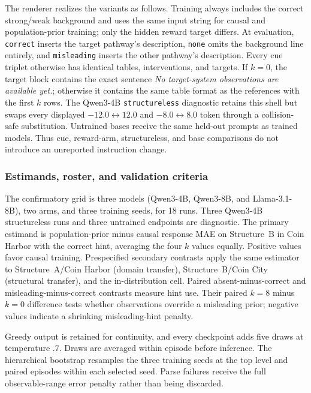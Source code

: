 The renderer realizes the variants as follows. Training always includes the
correct strong/weak background and uses the same input string for causal and
population-prior training; only the hidden reward target differs. At evaluation,
\texttt{correct} inserts the target pathway's description, \texttt{none} omits
the background line entirely, and \texttt{misleading} inserts the other
pathway's description. Every cue triplet otherwise has identical tables,
interventions, and targets. If $k=0$, the target block contains the exact
sentence \emph{No target-system observations are available yet.}; otherwise it
contains the same table format as the references with the first $k$ rows. The
Qwen3-4B \texttt{structureless} diagnostic retains this shell but swaps every
displayed $-12.0\leftrightarrow12.0$ and $-8.0\leftrightarrow8.0$ token through
a collision-safe substitution. Untrained bases receive the same held-out
prompts as trained models. Thus cue, reward-arm, structureless, and base
comparisons do not introduce an unreported instruction change.

\subsubsection{Estimands, roster, and validation criteria}

The confirmatory grid is three models (Qwen3-4B, Qwen3-8B, and
Llama-3.1-8B), two arms, and three training seeds, for 18 runs. Three
Qwen3-4B structureless runs and three untrained endpoints are diagnostic.
The primary estimand is population-prior minus causal response MAE on
Structure~B in Coin Harbor with the correct hint, averaging the four $k$ values
equally. Positive values favor causal training. Prespecified secondary contrasts
apply the same estimator to Structure~A/Coin Harbor (domain transfer),
Structure~B/Coin City (structural transfer), and the in-distribution cell.
Paired absent-minus-correct and misleading-minus-correct contrasts measure hint
use. Their paired $k=8$ minus $k=0$ difference tests whether observations override
a misleading prior; negative values indicate a shrinking misleading-hint penalty.

Greedy output is retained for continuity, and every checkpoint adds five draws at
temperature $.7$. Draws are averaged within episode before inference. The
hierarchical bootstrap resamples the three training seeds at the top level and
paired episodes within each selected seed. Parse failures receive the full
observable-range error penalty rather than being discarded.

